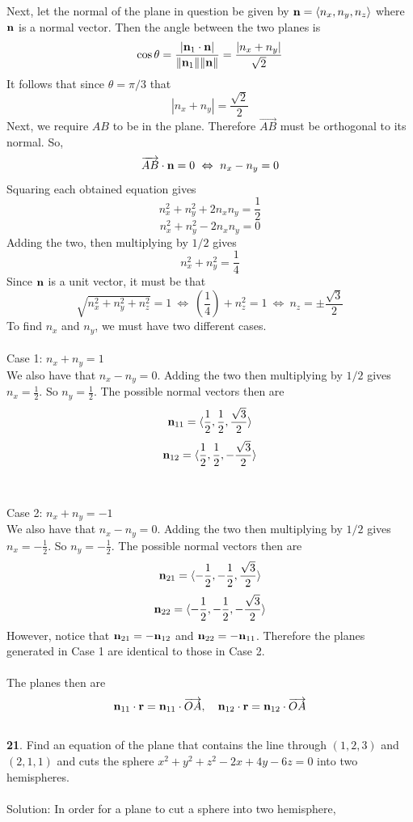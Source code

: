 \documentclass[12pt]{amsbook}
\newcommand{\la}{\langle}
\newcommand{\ra}{\rangle}
\begin{document}
Next, let the normal of the plane in question be given by ${\bf n}=\la n_x,n_y,n_z \ra$ where ${\bf n}$ is a normal vector. Then the angle between the two planes is
$$\cos\theta=\frac{|{\bf n}_1\cdot{\bf n}|}{
\|{\bf n}_1\|\|{\bf n}\|}=\frac{|n_x+n_y|}{\sqrt{2}}$$
It follows that since $\theta=\pi/3$ that 
$$|n_x+n_y|=\frac{\sqrt{2}}{2}$$
Next, we require $AB$ to be in the plane. Therefore $\overrightarrow{AB}$ must be orthogonal to its normal. So,
$$\overrightarrow{AB}\cdot{\bf n}=0 \ \Leftrightarrow \ n_x-n_y=0$$
Squaring each obtained equation gives
$$n_x^2+n_y^2+2n_xn_y=\frac{1}{2}$$
$$n_x^2+n_y^2-2n_xn_y=0$$
Adding the two, then multiplying by $1/2$ gives
$$n_x^2+n_y^2=\frac{1}{4}$$
Since ${\bf n}$ is a unit vector, it must be that
$$\sqrt{n_x^2+n_y^2+n_z^2}=1 \ \Leftrightarrow \ (\frac{1}{4})+n_z^2=1 \ \Leftrightarrow \ n_z=\pm \frac{\sqrt{3}}{2}$$
To find $n_x$ and $n_y$, we must have two different cases.
\\
\\
Case 1: $n_x+n_y=1$
\\
We also have that $n_x-n_y=0$. Adding the two then multiplying by $1/2$ gives $n_x=\frac{1}{2}$. So $n_y=\frac{1}{2}$. The possible normal vectors then are
$${\bf n}_{11}=\la \frac{1}{2}, \frac{1}{2}, \frac{\sqrt{3}}{2} \ra$$
$${\bf n}_{12}=\la \frac{1}{2}, \frac{1}{2}, -\frac{\sqrt{3}}{2} \ra$$
\\
\\
Case 2: $n_x+n_y=-1$
\\
We also have that $n_x-n_y=0$. Adding the two then multiplying by $1/2$ gives $n_x=-\frac{1}{2}$. So $n_y=-\frac{1}{2}$. The possible normal vectors then are
$${\bf n}_{21}=\la -\frac{1}{2}, -\frac{1}{2}, \frac{\sqrt{3}}{2} \ra$$
$${\bf n}_{22}=\la -\frac{1}{2}, -\frac{1}{2}, -\frac{\sqrt{3}}{2} \ra$$
However, notice that ${\bf n}_{21}=-{\bf n}_{12}$ and  ${\bf n}_{22}=-{\bf n}_{11}$. Therefore the planes generated in Case 1 are identical to those in Case 2. 
\\
\\
The planes then are
$${\bf n}_{11}\cdot {\bf r}={\bf n}_{11}\cdot \overrightarrow{OA}, \ \ \ {\bf n}_{12}\cdot {\bf r}={\bf n}_{12}\cdot \overrightarrow{OA}$$
\\
{\small\bf 21}. Find an equation of the plane 
that contains the line through $(1,2,3)$ and 
$(2,1,1)$ and cuts the sphere
$x^2+y^2+z^2-2x+4y-6z=0$ into two hemispheres.\\
\\
{\sc Solution}: In order for a plane to cut a sphere into two hemisphere,
\end{document}
